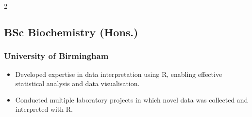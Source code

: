 \documentclass{article}
\begin{document}
\begin{paracol}{2}
  \subsection{BSc Biochemistry (Hons.)}
  \subsubsection{University of Birmingham}
  \hspace*{\fill}{\small Graduated 2019}
  \begin{itemize}[leftmargin=*]
    \setlength\itemsep{-2pt}
    \item Developed expertise in data interpretation using R, enabling effective statistical analysis and data visualisation.
    \item Conducted multiple laboratory projects in which novel data was collected and interpreted with R.
  \end{itemize}

\end{paracol}
\end{document}
